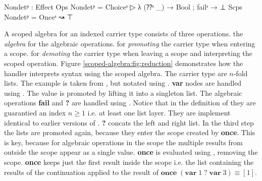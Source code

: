 \begin{code}
Nondetᵖ : Effect
Ops   Nondetᵖ = Choiceˢ  ▷ λ{ (⁇ˢ _) → Bool ; failˢ → ⊥ }
Scps  Nondetᵖ = Onceˢ    ↝ ⊤
\end{code}
A scoped algebra for an  indexed carrier type 
consists of three operations.
 the \textit{algebra} for the algebraic operations.
 for \textit{promoting} the carrier type when entering a scope.
 for \textit{demoting} the carrier type when leaving a scope and
interpreting the scoped operation.
Figure \ref{scoped-algebra:fig:reduction} demonstrates how the handler
interprets  syntax using the scoped algebra.
The carrier type are $n$-fold lists.
The example is taken from \textcite{DBLP:conf/lics/PirogSWJ18}, but notated
using
\AgdaSpace{}\AgdaSpace{}.
\textbf{var} nodes are handled using .
The value is promoted by lifting it into a singleton list.
The algebraic operations \textbf{fail} and \textbf{?} are handled using
.
Notice that in the definition of  they are guarantied an index
$n\geqslant 1$ i.e. at least one list layer.
They are implement identical to earlier versions of .
\textbf{?} concats the left and right list.
In the third step the lists are promoted again, because they enter the scope
created by \textbf{once}.
This is key, because for algebraic operations in the scope the multiple results
from outside the scope appear as a single value.
\textbf{once} is evaluated using , removing the scope.
\textbf{once} keeps just the first result inside the scope i.e. the list
containing the results of the continuation applied to the result of
$\textbf{once}\;(\textbf{var}\;1\;?\;\textbf{var}\;3)\equiv [1]$.

